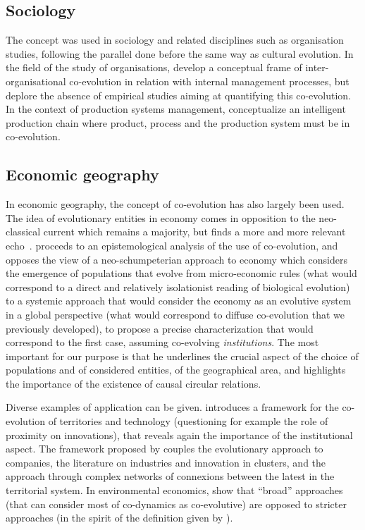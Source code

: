 \documentclass[letterpaper]{article}
\begin{document}
\subsection{Sociology}

The concept was used in sociology and related disciplines such as organisation studies, following the parallel done before the same way as cultural evolution. In the field of the study of organisations, \cite{volberda2003co} develop a conceptual frame of inter-organisational co-evolution in relation with internal management processes, but deplore the absence of empirical studies aiming at quantifying this co-evolution. In the context of production systems management, \cite{tolio2010species} conceptualize an intelligent production chain where product, process and the production system must be in co-evolution.


\subsection{Economic geography}

In economic geography, the concept of co-evolution has also largely been used. The idea of evolutionary entities in economy comes in opposition to the neo-classical current which remains a majority, but finds a more and more relevant echo~\citep{nelson2009evolutionary}. \cite{schamp201020} proceeds to an epistemological analysis of the use of co-evolution, and opposes the view of a neo-schumpeterian approach to economy which considers the emergence of populations that evolve from micro-economic rules (what would correspond to a direct and relatively isolationist reading of biological evolution) to a systemic approach that would consider the economy as an evolutive system in a global perspective (what would correspond to diffuse co-evolution that we previously developed), to propose a precise characterization that would correspond to the first case, assuming co-evolving \emph{institutions}. The most important for our purpose is that he underlines the crucial aspect of the choice of populations and of considered entities, of the geographical area, and highlights the importance of the existence of causal circular relations.


Diverse examples of application can be given. \cite{colletis2010co} introduces a framework for the co-evolution of territories and technology (questioning for example the role of proximity on innovations), that reveals again the importance of the institutional aspect. The framework proposed by \cite{ter2011co} couples the evolutionary approach to companies, the literature on industries and innovation in clusters, and the approach through complex networks of connexions between the latest in the territorial system. In environmental economics, \cite{kallis2007coevolution} show that ``broad'' approaches (that can consider most of co-dynamics as co-evolutive) are opposed to stricter approaches (in the spirit of the definition given by \cite{schamp201020}).
\end{document}
